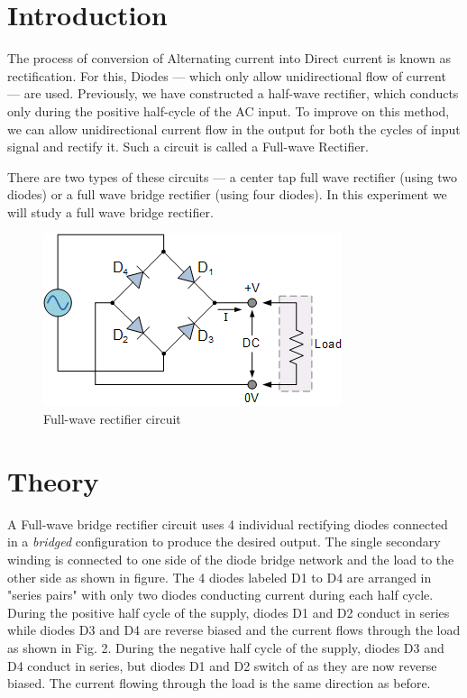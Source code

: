 \section{Introduction}

The process of conversion of Alternating current into Direct current is known as rectification. For this, Diodes --- which only allow unidirectional flow of current --- are used. Previously, we have constructed a half-wave rectifier, which conducts only during the positive half-cycle of the AC input. To improve on this method, we can allow unidirectional current flow in the output for both the cycles of input signal and rectify it. Such a circuit is called a Full-wave Rectifier.

There are two types of these circuits ---  a center tap full wave rectifier (using two diodes) or a full wave bridge rectifier (using four diodes). In this experiment we will study a full wave bridge rectifier. 

\begin{figure}[H]
    \centering
    \includegraphics[width=0.7\columnwidth]{images/f1.png}
    \caption{Full-wave rectifier circuit}
    \label{circuit1}
\end{figure}

\section{Theory}

A Full-wave bridge rectifier circuit uses 4 individual rectifying diodes connected in a \textit{bridged} configuration to produce the desired output. The single secondary winding is connected to one side of the diode bridge network and the load to the other side as shown in figure. The 4 diodes labeled D1 to D4 are arranged in "series pairs" with only two diodes conducting current during each half cycle. During the positive half cycle of the supply, diodes D1 and D2 conduct in series while diodes D3 and D4 are reverse biased and the current flows through the load as shown in Fig. 2. During the negative half cycle of the supply, diodes D3 and D4 conduct in series, but diodes D1 and D2 switch of as they are now reverse biased. The current flowing through the load is the same direction as before. 

